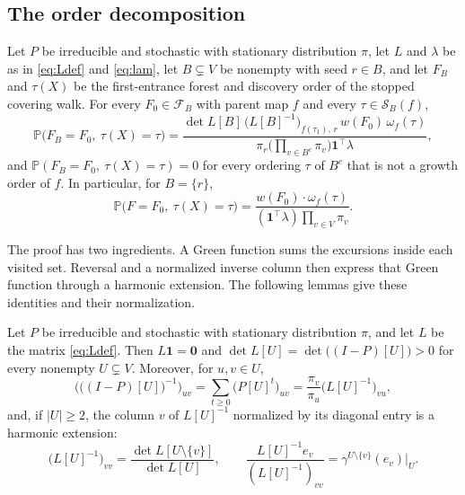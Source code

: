 \documentclass[onefignum,onetabnum]{siamart250211}
\numberwithin{theorem}{section}
\numberwithin{equation}{section}
\newcommand{\Orders}{\mathcal{S}}
\newcommand{\Fset}{\mathcal{F}}
\newcommand{\pr}{\mathbb{P}}
\newcommand{\one}{\mathbf{1}}
\newcommand{\zero}{\mathbf{0}}
\begin{document}
\subsection{The order decomposition}\label{sec:orderlaw}


\begin{proposition}\label{prop:orderlaw}
Let $P$ be irreducible and stochastic with stationary distribution
$\pi$, let $L$ and $\lambda$ be as in \eqref{eq:Ldef} and
\eqref{eq:lam}, let $B\subsetneq V$ be nonempty with seed $r\in B$, and
let $F_B$ and $\tau(X)$ be the first-entrance forest and discovery
order of the stopped covering walk. For every $F_0\in\Fset_B$ with
parent map $f$ and every $\tau\in\Orders_B(f)$,
\begin{equation}\label{eq:orderlaw}
\pr\big(F_B=F_0,\ \tau(X)=\tau\big)
=\frac{\det L[B]\,\big(L[B]^{-1}\big)_{f(\tau_1),\,r}\,w(F_0)\,\omega_f(\tau)}
{\pi_r\big(\prod_{v\in B^c}\pi_v\big)\one^{\top}\lambda},
\end{equation}
and $\pr(F_B=F_0,\ \tau(X)=\tau)=0$ for every ordering $\tau$ of $B^c$
that is not a growth order of $f$. In particular, for $B=\{r\}$,
\begin{equation}\label{eq:orderlaw1}
\pr\big(F=F_0,\ \tau(X)=\tau\big)
=\frac{w(F_0)\cdot\omega_f(\tau)}{(\one^{\top}\lambda)\prod_{v\in V}\pi_v}.
\end{equation}
\end{proposition}

The proof has two ingredients. A Green function sums the excursions
inside each visited set. Reversal and a normalized inverse column
then express that Green function through a harmonic extension.
The following lemmas give these identities and their normalization.

\begin{lemma}\label{lem:admissible}
Let $P$ be irreducible and stochastic with stationary distribution
$\pi$, and let $L$ be the matrix \eqref{eq:Ldef}. Then $L\one=\zero$
and $\det L[U]=\det\big((I-P)[U]\big)>0$ for every nonempty
$U\subsetneq V$. Moreover, for $u,v\in U$,
\begin{equation}\label{eq:green}
\Big(\big((I-P)[U]\big)^{-1}\Big)_{uv}
=\sum_{t\ge0}\big(P[U]^t\big)_{uv}
=\frac{\pi_v}{\pi_u}\big(L[U]^{-1}\big)_{vu},
\end{equation}
and, if $|U|\ge2$, the column $v$ of $L[U]^{-1}$ normalized by its
diagonal entry is a harmonic extension:
\begin{equation}\label{eq:ratio}
\big(L[U]^{-1}\big)_{vv}=\frac{\det L[U\setminus\{v\}]}{\det L[U]},
\qquad
\frac{L[U]^{-1}e_v}{(L[U]^{-1})_{vv}}
=\gamma^{U\setminus\{v\}}(e_v)\big|_U .
\end{equation}
\end{lemma}
\end{document}
